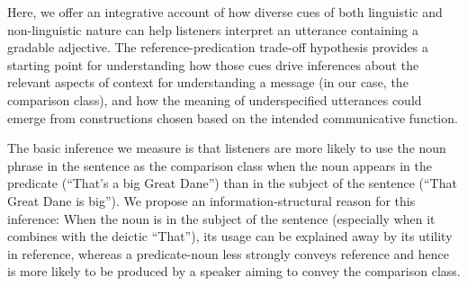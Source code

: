 \documentclass[10pt,letterpaper]{article}
\begin{document}
Here, we offer an integrative account of how diverse cues of both linguistic and non-linguistic nature can help listeners interpret an utterance containing a gradable adjective. The reference-predication trade-off hypothesis provides a starting point for understanding how those cues %
drive inferences about the relevant aspects of context for understanding a message (in our case, the comparison class), and how the meaning of underspecified utterances could emerge from constructions chosen based on the intended communicative function.

The basic inference we measure is that listeners are more likely to use the noun phrase in the sentence as the comparison class when the noun appears in the predicate (``That's a big Great Dane'') than in the subject of the sentence (``That Great Dane is big''). We propose an information-structural reason for this inference: When the noun is in the subject of the sentence (especially when it combines with the deictic ``That''), its usage can be explained away by its utility in reference, whereas a predicate-noun less strongly conveys reference and hence is more likely to be produced by a speaker aiming to convey the comparison class. 

 
\end{document}
